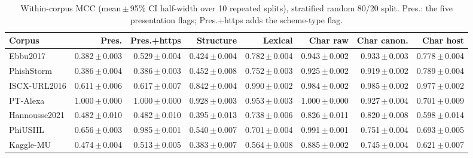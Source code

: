 \begin{table}[tp]
\centering
\caption{Within-corpus MCC (mean\,$\pm$\,95\% CI half-width over 10 repeated splits), stratified random 80/20 split. Pres.: the five presentation flags; Pres.+https adds the scheme-type flag.}
\label{tab:within_random}
\footnotesize
\setlength{\tabcolsep}{3pt}
\begin{adjustbox}{max width=\linewidth}
\begin{tabular}{@{}lrrrrrrr@{}}
\toprule
Corpus & Pres. & Pres.+https & Structure & Lexical & Char raw & Char canon. & Char host \\
\midrule
Ebbu2017 & 0.382\,$\pm$\,0.003 & 0.529\,$\pm$\,0.004 & 0.424\,$\pm$\,0.004 & 0.782\,$\pm$\,0.004 & 0.943\,$\pm$\,0.002 & 0.933\,$\pm$\,0.003 & 0.778\,$\pm$\,0.004 \\
PhishStorm & 0.386\,$\pm$\,0.004 & 0.386\,$\pm$\,0.003 & 0.452\,$\pm$\,0.008 & 0.752\,$\pm$\,0.003 & 0.925\,$\pm$\,0.002 & 0.919\,$\pm$\,0.002 & 0.789\,$\pm$\,0.004 \\
ISCX-URL2016 & 0.611\,$\pm$\,0.006 & 0.617\,$\pm$\,0.007 & 0.842\,$\pm$\,0.004 & 0.990\,$\pm$\,0.002 & 0.984\,$\pm$\,0.002 & 0.985\,$\pm$\,0.002 & 0.977\,$\pm$\,0.002 \\
PT-Alexa & 1.000\,$\pm$\,0.000 & 1.000\,$\pm$\,0.000 & 0.928\,$\pm$\,0.003 & 0.953\,$\pm$\,0.003 & 1.000\,$\pm$\,0.000 & 0.927\,$\pm$\,0.004 & 0.701\,$\pm$\,0.009 \\
Hannousse2021 & 0.482\,$\pm$\,0.010 & 0.482\,$\pm$\,0.010 & 0.395\,$\pm$\,0.013 & 0.738\,$\pm$\,0.006 & 0.826\,$\pm$\,0.011 & 0.820\,$\pm$\,0.008 & 0.598\,$\pm$\,0.014 \\
PhiUSIIL & 0.656\,$\pm$\,0.003 & 0.985\,$\pm$\,0.001 & 0.540\,$\pm$\,0.007 & 0.701\,$\pm$\,0.004 & 0.991\,$\pm$\,0.001 & 0.751\,$\pm$\,0.004 & 0.693\,$\pm$\,0.005 \\
Kaggle-MU & 0.474\,$\pm$\,0.004 & 0.513\,$\pm$\,0.005 & 0.383\,$\pm$\,0.007 & 0.564\,$\pm$\,0.008 & 0.885\,$\pm$\,0.002 & 0.745\,$\pm$\,0.004 & 0.621\,$\pm$\,0.007 \\
\bottomrule
\end{tabular}
\end{adjustbox}
\end{table}
